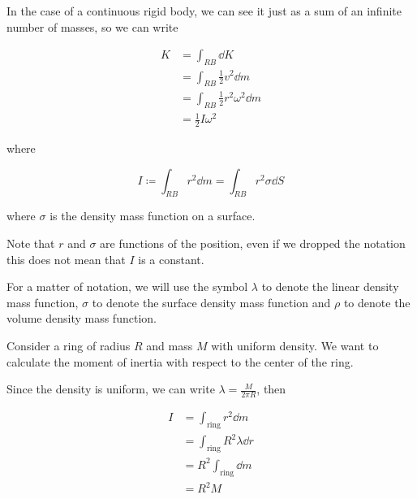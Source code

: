 \documentclass[12pt]{extarticle}
\begin{document}
In the case of a continuous rigid body, we can see it just as a sum of an infinite number of masses, so we can write

\begin{align}
    K & = \int_{RB} \dd{K}                          \\
      & = \int_{RB} \frac{1}{2} v^2 \dd{m}          \\
      & = \int_{RB} \frac{1}{2} r^2 \omega^2 \dd{m} \\
      & = \frac{1}{2} I \omega^2
\end{align}

where

\begin{equation}
    I \coloneq \int_{RB} r^2 \dd{m} = \int_{RB} r^2 \sigma \dd{S}
\end{equation}

where $\sigma$ is the density mass function on a surface.

Note that $r$ and $\sigma$ are functions of the position, even if we dropped the notation this does not mean that $I$ is a constant.

\begin{remark}
    For a matter of notation, we will use the symbol $\lambda$ to denote the linear density mass function, $\sigma$ to denote the surface density mass function and $\rho$ to denote the volume density mass function.
\end{remark}

\begin{example}
    Consider a ring of radius $R$ and mass $M$ with uniform density. We want to calculate the moment of inertia with respect to the center of the ring.

    Since the density is uniform, we can write $\lambda = \frac{M}{2\pi R}$, then

    \begin{align}
        I & = \int_{\text{ring}} r^2 \dd{m}         \\
          & = \int_{\text{ring}} R^2 \lambda \dd{r} \\
          & =  R^2 \int_{\text{ring}} \dd{m}        \\
          & = R^2 M
    \end{align}
\end{example}
\end{document}
